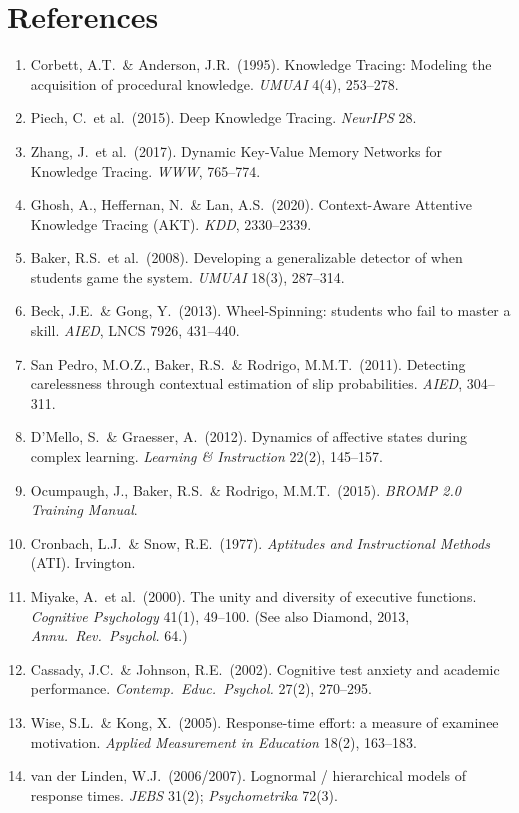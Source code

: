 \documentclass[11pt]{article}
\begin{document}
\section*{References}
\small
\begin{enumerate}[leftmargin=1.5em,itemsep=0pt]
\item Corbett, A.T.\ \& Anderson, J.R.\ (1995). Knowledge Tracing: Modeling the acquisition of procedural knowledge. \emph{UMUAI} 4(4), 253--278.
\item Piech, C.\ et al.\ (2015). Deep Knowledge Tracing. \emph{NeurIPS} 28.
\item Zhang, J.\ et al.\ (2017). Dynamic Key-Value Memory Networks for Knowledge Tracing. \emph{WWW}, 765--774.
\item Ghosh, A., Heffernan, N.\ \& Lan, A.S.\ (2020). Context-Aware Attentive Knowledge Tracing (AKT). \emph{KDD}, 2330--2339.
\item Baker, R.S.\ et al.\ (2008). Developing a generalizable detector of when students game the system. \emph{UMUAI} 18(3), 287--314.
\item Beck, J.E.\ \& Gong, Y.\ (2013). Wheel-Spinning: students who fail to master a skill. \emph{AIED}, LNCS 7926, 431--440.
\item San Pedro, M.O.Z., Baker, R.S.\ \& Rodrigo, M.M.T.\ (2011). Detecting carelessness through contextual estimation of slip probabilities. \emph{AIED}, 304--311.
\item D'Mello, S.\ \& Graesser, A.\ (2012). Dynamics of affective states during complex learning. \emph{Learning \& Instruction} 22(2), 145--157.
\item Ocumpaugh, J., Baker, R.S.\ \& Rodrigo, M.M.T.\ (2015). \emph{BROMP 2.0 Training Manual}.
\item Cronbach, L.J.\ \& Snow, R.E.\ (1977). \emph{Aptitudes and Instructional Methods} (ATI). Irvington.
\item Miyake, A.\ et al.\ (2000). The unity and diversity of executive functions. \emph{Cognitive Psychology} 41(1), 49--100. (See also Diamond, 2013, \emph{Annu.\ Rev.\ Psychol.} 64.)
\item Cassady, J.C.\ \& Johnson, R.E.\ (2002). Cognitive test anxiety and academic performance. \emph{Contemp.\ Educ.\ Psychol.} 27(2), 270--295.
\item Wise, S.L.\ \& Kong, X.\ (2005). Response-time effort: a measure of examinee motivation. \emph{Applied Measurement in Education} 18(2), 163--183.
\item van der Linden, W.J.\ (2006/2007). Lognormal / hierarchical models of response times. \emph{JEBS} 31(2); \emph{Psychometrika} 72(3).

\end{enumerate}
\end{document}
